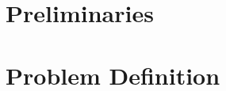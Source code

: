 \documentclass[a4paper,11pt,twoside]{memoir}
\begin{document}
\chapter{Preliminaries}
\label{ch:prelim}


\chapter{Problem Definition}
\label{ch:problem}

%
%
%
%
%
%
%
%
%
%




\nocite{gebhard-12}
\nocite{fritz-11}
\nocite{leitner-06}

\appendix



\end{document}
